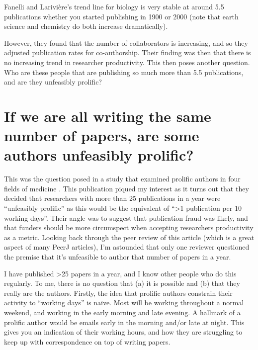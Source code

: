 \documentclass[
]{krantz}
\begin{document}
Fanelli and Larivière's \citeyearpar{fanelli2016researchers} trend line for biology is very stable at around 5.5 publications whether you started publishing in 1900 or 2000 (note that earth science and chemistry do both increase dramatically).

However, they found that the number of collaborators is increasing, and so they adjusted publication rates for co-authorship. Their finding was then that there is no increasing trend in researcher productivity. This then poses another question. Who are these people that are publishing so much more than 5.5 publications, and are they unfeasibly prolific?

\hypertarget{if-we-are-all-writing-the-same-number-of-papers-are-some-authors-unfeasibly-prolific}{%
\section{If we are all writing the same number of papers, are some authors unfeasibly prolific?}\label{if-we-are-all-writing-the-same-number-of-papers-are-some-authors-unfeasibly-prolific}}

This was the question posed in a study that examined prolific authors in four fields of medicine \citep{wager2015too}. This publication piqued my interest as it turns out that they decided that researchers with more than 25 publications in a year were ``unfeasibly prolific'' as this would be the equivalent of ``\textgreater1 publication per 10 working days''. Their angle was to suggest that publication fraud was likely, and that funders should be more circumspect when accepting researchers productivity as a metric. Looking back through the peer review of this article (which is a great aspect of many PeerJ articles), I'm astounded that only one reviewer questioned the premise that it's unfeasible to author that number of papers in a year.

I have published \textgreater25 papers in a year, and I know other people who do this regularly. To me, there is no question that (a) it is possible and (b) that they really are the authors. Firstly, the idea that prolific authors constrain their activity to ``working days'' is naïve. Most will be working throughout a normal weekend, and working in the early morning and late evening. A hallmark of a prolific author would be emails early in the morning and/or late at night. This gives you an indication of their working hours, and how they are struggling to keep up with correspondence on top of writing papers.
\end{document}
